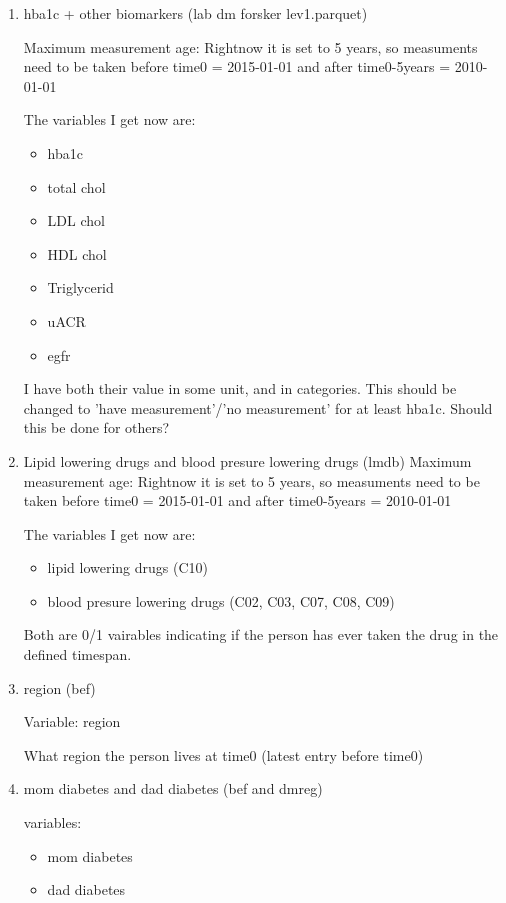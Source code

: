 \documentclass[11pt]{article}
\begin{document}
\begin{enumerate}
\item hba1c + other biomarkers (lab dm forsker lev1.parquet)
\label{sec:org60bde18}

Maximum measurement age: Rightnow it is set to 5 years, so measuments need to be taken before time0 = 2015-01-01 and after time0-5years = 2010-01-01

The variables I get now are:
\begin{itemize}
\item hba1c
\item total chol
\item LDL chol
\item HDL chol
\item Triglycerid
\item uACR
\item egfr
\end{itemize}

I have both their value in some unit, and in categories. This should be changed to 'have measurement'/'no measurement' for at least hba1c. Should this be done for others?


\item Lipid lowering drugs and blood presure lowering drugs (lmdb)
\label{sec:org9297894}
Maximum measurement age: Rightnow it is set to 5 years, so measuments need to be taken before time0 = 2015-01-01 and after time0-5years = 2010-01-01

The variables I get now are:
\begin{itemize}
\item lipid lowering drugs (C10)
\item blood presure lowering drugs (C02, C03, C07, C08, C09)
\end{itemize}


Both are 0/1 vairables indicating if the person has ever taken the drug in the defined timespan.


\item region (bef)
\label{sec:org19bab6a}

Variable: region

What region the person lives at time0 (latest entry before time0)


\item mom diabetes and dad diabetes (bef and dmreg)
\label{sec:orgadf18f5}


variables:
\begin{itemize}
\item mom diabetes
\item dad diabetes
\end{itemize}



\end{enumerate}
\end{document}
